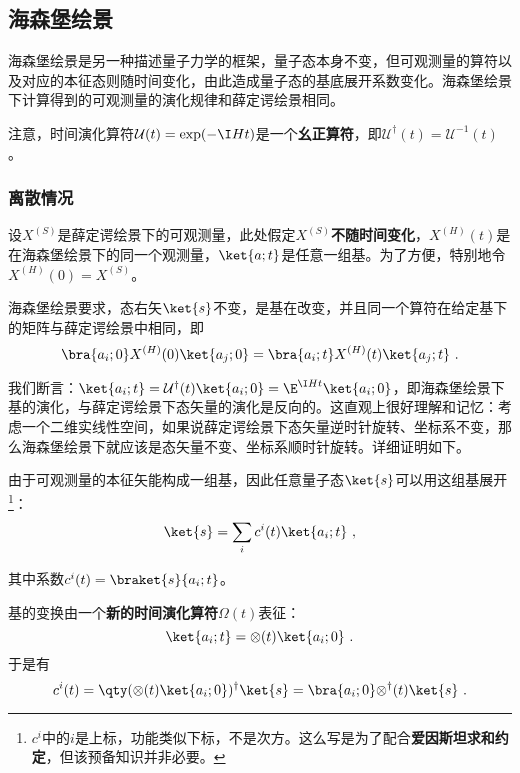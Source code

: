 \subsection{海森堡绘景}

海森堡绘景是另一种描述量子力学的框架，量子态本身不变，但可观测量的算符以及对应的本征态则随时间变化，由此造成量子态的基底展开系数变化。海森堡绘景下计算得到的可观测量的演化规律和薛定谔绘景相同。

注意，时间演化算符$\mathcal{U}(t)=\exp(-\I Ht)$是一个\textbf{幺正算符}，即$\mathcal{U}^\dagger(t)=\mathcal{U}^{-1}(t)$。

\subsubsection{离散情况}



设$X^{(S)}$是薛定谔绘景下的可观测量，此处假定$X^{(S)}$\textbf{不随时间变化}，$X^{(H)}(t)$是在海森堡绘景下的同一个观测量，$\ket{a; t}$是任意一组基。为了方便，特别地令$X^{(H)}(0)=X^{(S)}$。


海森堡绘景要求，态右矢$\ket{s}$不变，是基在改变，并且同一个算符在给定基下的矩阵与薛定谔绘景中相同，即
\begin{equation}\label{eq_HsbPic_16}
\bra{a_i; 0}X^{(H)}(0)\ket{a_j; 0} = \bra{a_i; t}X^{(H)}(t)\ket{a_j; t}~.
\end{equation}

我们断言：$\ket{a_i; t} = \mathcal{U}^\dagger(t)\ket{a_i; 0} = \E^{\I H t}\ket{a_i; 0}$，即海森堡绘景下基的演化，与薛定谔绘景下态矢量的演化是反向的。这直观上很好理解和记忆：考虑一个二维实线性空间，如果说薛定谔绘景下态矢量逆时针旋转、坐标系不变，那么海森堡绘景下就应该是态矢量不变、坐标系顺时针旋转。详细证明如下。

由于可观测量的本征矢能构成一组基，因此任意量子态$\ket{s}$可以用这组基展开\footnote{$c^i$中的$i$是上标，功能类似下标，不是次方。这么写是为了配合\textbf{爱因斯坦求和约定}，但该预备知识并非必要。}：
\begin{equation}\label{eq_HsbPic_12}
\ket{s} = \sum_i c^i(t)\ket{a_i; t}~,
\end{equation}

其中系数$c^i(t)=\braket{s}{a_i; t}$。


基的变换由一个\textbf{新的时间演化算符}$\mathcal{\Omega}(t)$表征：
\begin{equation}\label{eq_HsbPic_13}
\ket{a_i; t} = \mathcal{\Omega}(t)\ket{a_i; 0}~.
\end{equation}
于是有
\begin{equation}\label{eq_HsbPic_14}
c^i(t) = \qty(\mathcal{\Omega}(t)\ket{a_i; 0})^\dagger\ket{s} = \bra{a_i; 0}\mathcal{\Omega}^\dagger(t)\ket{s}~.
\end{equation}

